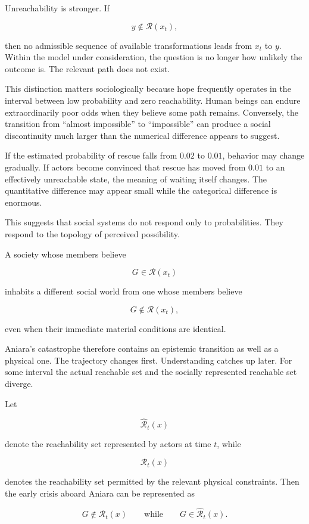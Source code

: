 \documentclass[11pt,oneside]{book}
\theoremstyle{definition}
\theoremstyle{remark}
\newcommand{\R}{\mathcal{R}}
\begin{document}
Unreachability is stronger. If

\[
y\notin\R(x_t),
\]

then no admissible sequence of available transformations leads from \(x_t\) to \(y\). Within the model under consideration, the question is no longer how unlikely the outcome is. The relevant path does not exist.

This distinction matters sociologically because hope frequently operates in the interval between low probability and zero reachability. Human beings can endure extraordinarily poor odds when they believe some path remains. Conversely, the transition from ``almost impossible'' to ``impossible'' can produce a social discontinuity much larger than the numerical difference appears to suggest.

If the estimated probability of rescue falls from \(0.02\) to \(0.01\), behavior may change gradually. If actors become convinced that rescue has moved from \(0.01\) to an effectively unreachable state, the meaning of waiting itself changes. The quantitative difference may appear small while the categorical difference is enormous.

This suggests that social systems do not respond only to probabilities. They respond to the topology of perceived possibility.

A society whose members believe

\[
G\in\R(x_t)
\]

inhabits a different social world from one whose members believe

\[
G\notin\R(x_t),
\]

even when their immediate material conditions are identical.

Aniara's catastrophe therefore contains an epistemic transition as well as a physical one. The trajectory changes first. Understanding catches up later. For some interval the actual reachable set and the socially represented reachable set diverge.

Let

\[
\widehat{\R}_t(x)
\]

denote the reachability set represented by actors at time \(t\), while

\[
\R_t(x)
\]

denotes the reachability set permitted by the relevant physical constraints. Then the early crisis aboard Aniara can be represented as

\[
G\notin\R_t(x)
\qquad\text{while}\qquad
G\in\widehat{\R}_t(x).
\]
\end{document}
